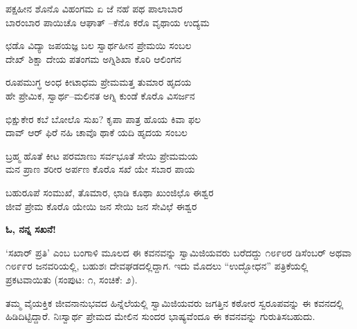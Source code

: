 
\begin{myquote}
ಪಕ್ಷಹೀನ ಶೊನೊ ವಿಹಂಗಮ ಏ ಜೆ ನಹೆ ಪಥ ಪಾಲಾಬಾರ\\ಬಾರಂಬಾರ ಪಾಯಿಚೊ ಆಘಾತ್ –ಕೆನೊ ಕರೊ ವೃಥಾಯ ಉದ್ಯಮ
\end{myquote}


\begin{myquote}
ಛಡೊ ವಿದ್ಯಾ ಜಪಯಜ್ಞ ಬಲ ಸ್ವಾರ್ಥಹೀನ ಪ್ರೇಮಯಿ ಸಂಬಲ\\ದೇಖ್ ಶಿಕ್ಷಾ ದೇಯ ಪತಂಗಮ ಅಗ್ನಿಶಿಖಾ ಕೊರಿ ಆಲಿಂಗನ
\end{myquote}


\begin{myquote}
ರೂಪಮುಗ್ಧ ಅಂಧ ಕೀಟಾಧಮ ಪ್ರೇಮಮತ್ತ ತುಮಾರ ಹೃದಯ\\ಹೇ ಪ್ರೇಮಿಕ, ಸ್ವಾರ್ಥ–ಮಲಿನತ ಅಗ್ನಿ ಕುಂಡೆ ಕೊರೊ ವಿಸರ್ಜನ
\end{myquote}


\begin{myquote}
ಭಿಕ್ಷುಕೇರ ಕಬೆ ಬೋಲೊ ಸುಖ? ಕೃಪಾ ಪಾತ್ರ ಹೊಯ ಕಿವಾ ಫಲ\\ದಾವ್ ಆರ್ ಫಿರೆ ನಹಿ ಚಾವೊ ಥಾಕೆ ಯದಿ ಹೃದಯ ಸಂಬಲ
\end{myquote}



\begin{myquote}
ಬ್ರಹ್ಮ ಹೊತೆ ಕೀಟ ಪರಮಾಣು ಸರ್ವಭೂತೆ ಸೇಯಿ ಪ್ರೇಮಮಯ\\ಮನ ಪ್ರಾಣ ಶರೀರ ಅರ್ಪಣ ಕೊರೊ ಸಖೆ ಯೇ ಸಬಾರ ಪಾಯ
\end{myquote}


\begin{myquote}
ಬಹುರೂಪೆ ಸಂಮುಖೆ, ತೊಮಾರ, ಛಾಡಿ ಕೂಥಾ ಖುಂಜಿಛೊ ಈಶ್ವರ\\ಜೀವೆ ಪ್ರೇಮ ಕೊರೊ ಯೇಯಿ ಜನ ಸೇಯಿ ಜನ ಸೇವಿಛೆ ಈಶ್ವರ
\end{myquote}


\begin{center}
\textbf{ಓ, ನನ್ನ ಸಖನೆ!}
\end{center}

‘ಸಖಾರ್ ಪ್ರತಿ’ ಎಂಬ ಬಂಗಾಳಿ ಮೂಲದ ಈ ಕವನವನ್ನು ಸ್ವಾಮಿಜಿಯವರು ಬರೆದದ್ದು ೧೮೯೮ರ ಡಿಸೆಂಬರ್ ಅಥವಾ ೧೮೯೯ರ ಜನವರಿಯಲ್ಲಿ, ಬಹುಶಃ ದೇವಘಡದಲ್ಲಿದ್ದಾಗ. ಇದು ಮೊದಲು “ಉದ್ಭೋಧನ” ಪತ್ರಿಕೆಯಲ್ಲಿ ಪ್ರಕಟವಾಯಿತು (ಸಂಪುಟ: ೧, ಸಂಚಿಕೆ: ೨).

ತಮ್ಮ ವೈಯಕ್ತಿಕ ಜೀವನಾನುಭವದ ಹಿನ್ನೆಲೆಯಲ್ಲಿ ಸ್ವಾಮಿಜಿಯವರು ಜಗತ್ತಿನ ಕಠೋರ ಸ್ವರೂಪವನ್ನು ಈ ಕವನದಲ್ಲಿ ಹಿಡಿದಿಟ್ಟಿದ್ದಾರೆ. ನಿಃಸ್ವಾರ್ಥ ಪ್ರೇಮದ ಮೇಲಿನ ಸುಂದರ ಭಾಷ್ಯವೆಂದೂ ಈ ಕವನವನ್ನು ಗುರುತಿಸಬಹುದು.

